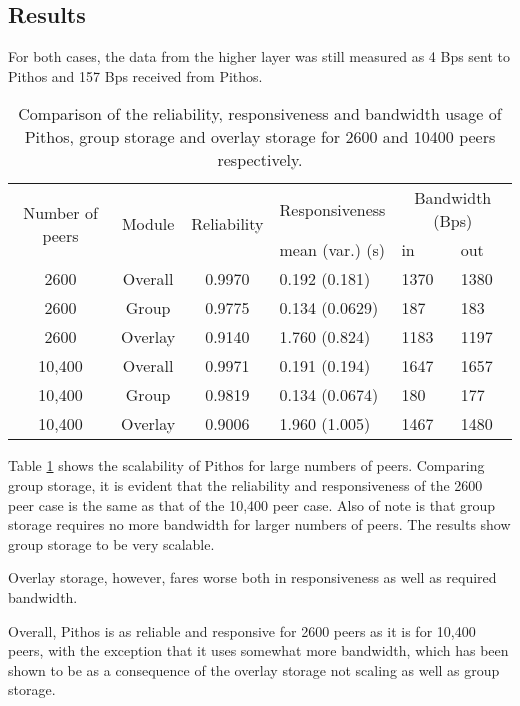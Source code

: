 \subsection{Results}

For both cases, the data from the higher layer was still measured as 4 Bps sent to Pithos and 157 Bps received from Pithos.

\begin{table}[htbp]
\centering
\begin{tabular}{|c|c|c|l|l|l|}
\hline
\multirow{2}{*}{Number of peers} & \multirow{2}{*}{Module} & \multirow{2}{*}{Reliability} & Responsiveness  & \multicolumn{2}{c|}{Bandwidth (Bps)} \\
\cline{5-6}
                &        &             &  mean (var.) (s)            &in & out   \\
\hline
2600            & Overall&  0.9970     &   0.192 (0.181)      & 1370&1380 \\
2600            & Group  &  0.9775     &   0.134 (0.0629)     & 187&183   \\
2600            & Overlay&  0.9140     &   1.760 (0.824)      & 1183&1197 \\
10,400          & Overall&  0.9971     &   0.191 (0.194)      & 1647&1657 \\
10,400          & Group  &  0.9819     &   0.134 (0.0674)     & 180&177   \\
10,400          & Overlay&  0.9006     &   1.960 (1.005)      & 1467&1480 \\
\hline
\end{tabular}
\caption{Comparison of the reliability, responsiveness and bandwidth usage of Pithos, group storage and overlay storage for 2600 and 10400 peers respectively.}
\label{tab_pithos_scalability_results}
\end{table}
%
Table \ref{tab_pithos_scalability_results} shows the scalability of Pithos for large numbers of peers. Comparing group storage, it is evident that the reliability and responsiveness of the 2600 peer case is the same as that of the 10,400 peer case. Also of note is that group storage requires no more bandwidth for larger numbers of peers. The results show group storage to be very scalable.

Overlay storage, however, fares worse both in responsiveness as well as required bandwidth.

Overall, Pithos is as reliable and responsive for 2600 peers as it is for 10,400 peers, with the exception that it uses somewhat more bandwidth, which has been shown to be as a consequence of the overlay storage not scaling as well as group storage.

